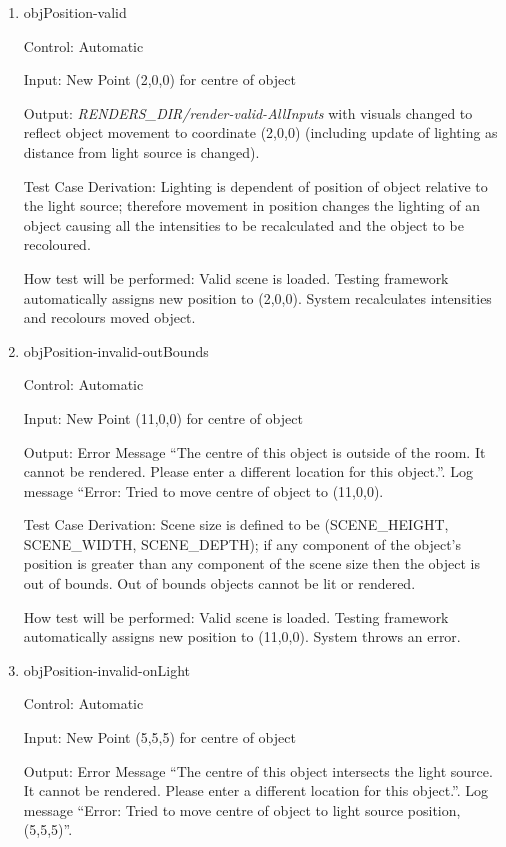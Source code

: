\documentclass[12pt, titlepage]{article}
\begin{document}
\begin{enumerate}
	\item{objPosition-valid\\}
	
	Control: Automatic
	
	Input: New Point (2,0,0) for centre of object
	
	Output: \textit{RENDERS\_DIR/render-valid-AllInputs} with visuals changed 
	to reflect object movement to coordinate (2,0,0) (including update of 
	lighting as distance from light source is changed).
	
	Test Case Derivation: Lighting is dependent of position of object relative 
	to the light source; therefore movement in position changes the lighting of 
	an object causing all the intensities to be recalculated and the object to 
	be recoloured.

	How test will be performed: Valid scene is loaded. Testing framework 
	automatically assigns new position to (2,0,0). System recalculates 
	intensities and recolours moved object.
	
	\item{objPosition-invalid-outBounds\\}
	
	Control: Automatic
	
	Input: New Point (11,0,0) for centre of object
	
	Output: Error Message ``The centre of this object is outside of the room. 
	It cannot be rendered. Please enter a different location for this 
	object.''. Log message ``Error: Tried to move centre of object to (11,0,0).
	
	Test Case Derivation: Scene size is defined to be (SCENE\_HEIGHT, 
	SCENE\_WIDTH, SCENE\_DEPTH); if any component of the object's position is 
	greater than any component of the scene size then the object is out of 
	bounds. Out of bounds objects cannot be lit or rendered.
	
	How test will be performed: Valid scene is loaded. Testing framework 
	automatically assigns new position to (11,0,0). System throws an error.
	
	\item{objPosition-invalid-onLight\\}
	
	Control: Automatic
	
	Input: New Point (5,5,5) for centre of object
	
	Output: Error Message ``The centre of this object intersects the light 
	source.	It cannot be rendered. Please enter a different location for this 
	object.''. Log message ``Error: Tried to move centre of object to light 
	source position, (5,5,5)''.
	

\end{enumerate}
\end{document}
